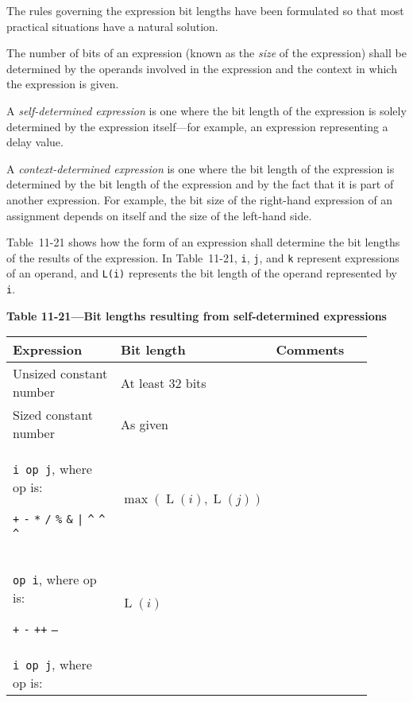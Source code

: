 \documentclass{article}
\DeclareMathOperator{\Size}{L}
\newcommand{\tild}{\raisebox{-.7ex}{\textasciitilde{}}}
\newcommand{\binOp}{\texttt{+} \texttt{-} \texttt{*} \texttt{/} \texttt{\%}
\texttt{\&} \texttt{|} \texttt{\^{}} \texttt{\^{}\tild} \texttt{\tild\^{}}}
\newcommand{\unOp}{\texttt{+} \texttt{-} \texttt{\tild} \texttt{++}  \texttt{--}}
\begin{document}
  {
    \color{red}

    The rules governing the expression bit lengths have been formulated so that most
    practical situations have a natural solution.

    The number of bits of an expression (known as the \emph{size} of the
    expression) shall be determined by the operands involved in the expression and
    the context in which the expression is given.

    A \emph{self-determined expression} is one where the bit length of the expression is
    solely determined by the expression itself—for example, an expression
    representing a delay value.

    A \emph{context-determined expression} is one where the bit length of the expression is
    determined by the bit length of the expression and by the fact that it is part
    of another expression. For example, the bit size of the right-hand expression of
    an assignment depends on itself and the size of the left-hand side.

    Table~11-21 shows how the form of an expression shall determine the bit lengths
    of the results of the expression. In Table~11-21, \texttt{i}, \texttt{j}, and
    \texttt{k} represent expressions of an operand, and \texttt{L(i)} represents the
    bit length of the operand represented by \texttt{i}.

    \begin{center}
      \textbf{Table 11-21---Bit lengths resulting from self-determined expressions}
      \begin{longtable}{|p{0.35\linewidth}|C{0.25\linewidth}|C{0.3\linewidth}|}
        \hline
        \centering \textbf{Expression}
         & \textbf{Bit length}
         & \textbf{Comments}
        \\
        \hline
        Unsized constant number
         & At least 32 bits
         &
        \\
        \hline
        Sized constant number
         & As given
         &
        \\
        \hline
        \verb|i op j|, where op is:

        \binOp{}
         & $\max\left(\Size(i), \Size(j)\right)$
         &
        \\
        \hline
        \verb|op i|, where op is:

        \unOp{}
         & $\Size(i)$
         &
        \\
        \hline
        \verb|i op j|, where op is:


\end{longtable}
\end{center}}
\end{document}
